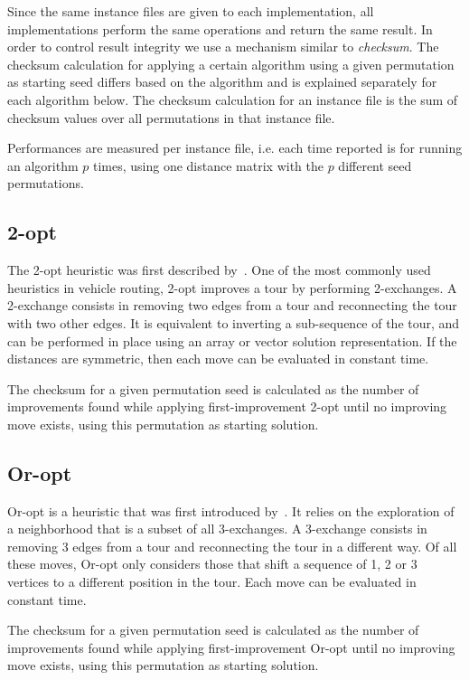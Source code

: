 \documentclass[11pt,a4paper,notitlepage]{article}
\begin{document}
Since the same instance files are given to 
each implementation, all implementations perform the same operations
and return the same result. In order to control result integrity we use a
mechanism similar to \emph{checksum}. The checksum calculation for
applying a certain algorithm using a given permutation as starting seed differs
based on the algorithm and is explained separately for each algorithm
below. The checksum calculation for an instance file is the sum of
checksum values over all permutations in that instance file.

Performances are measured per instance file, i.e. each time reported
is for running an algorithm $p$ times, using one distance matrix with the $p$
different seed permutations.

\subsection{2-opt}
The 2-opt heuristic was first described by~\cite{2-opt}.
One of the most commonly used heuristics in vehicle routing, 2-opt
improves a tour by performing 2-exchanges. A 2-exchange consists in
removing two edges from a tour and reconnecting the tour with two
other edges. It is equivalent to inverting a sub-sequence of the
tour, and can be performed in place using an array or vector solution
representation. If the distances are symmetric, then each move can be
evaluated in constant time. 

The checksum for a given permutation seed is calculated as the number of
improvements found while applying first-improvement 2-opt until no
improving move exists, using this permutation as starting solution.

\subsection{Or-opt}
Or-opt is a heuristic that was first introduced by~\cite{Or-opt}.
It relies on the exploration of a neighborhood that is a subset of all
3-exchanges. A 3-exchange consists in removing 3 edges from a tour and
reconnecting the tour in a different way. Of all these moves, Or-opt
only considers those that shift a sequence of 1, 2 or 3 vertices to a
different position in the tour. Each move can be evaluated in constant time. 

The checksum for a given permutation seed is calculated as the number of
improvements found while applying first-improvement Or-opt until no
improving move exists, using this permutation as starting solution.
\end{document}
